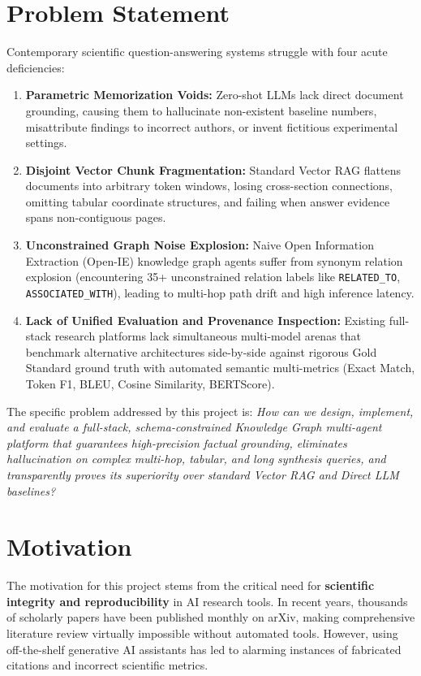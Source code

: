 \section{Problem Statement}
Contemporary scientific question-answering systems struggle with four acute deficiencies:
\begin{enumerate}
    \item \textbf{Parametric Memorization Voids:} Zero-shot LLMs lack direct document grounding, causing them to hallucinate non-existent baseline numbers, misattribute findings to incorrect authors, or invent fictitious experimental settings.
    \item \textbf{Disjoint Vector Chunk Fragmentation:} Standard Vector RAG flattens documents into arbitrary token windows, losing cross-section connections, omitting tabular coordinate structures, and failing when answer evidence spans non-contiguous pages.
    \item \textbf{Unconstrained Graph Noise Explosion:} Naive Open Information Extraction (Open-IE) knowledge graph agents suffer from synonym relation explosion (encountering 35+ unconstrained relation labels like \texttt{RELATED\_TO}, \texttt{ASSOCIATED\_WITH}), leading to multi-hop path drift and high inference latency.
    \item \textbf{Lack of Unified Evaluation and Provenance Inspection:} Existing full-stack research platforms lack simultaneous multi-model arenas that benchmark alternative architectures side-by-side against rigorous Gold Standard ground truth with automated semantic multi-metrics (Exact Match, Token F1, BLEU, Cosine Similarity, BERTScore).
\end{enumerate}

The specific problem addressed by this project is: \textit{How can we design, implement, and evaluate a full-stack, schema-constrained Knowledge Graph multi-agent platform that guarantees high-precision factual grounding, eliminates hallucination on complex multi-hop, tabular, and long synthesis queries, and transparently proves its superiority over standard Vector RAG and Direct LLM baselines?}

\section{Motivation}
The motivation for this project stems from the critical need for \textbf{scientific integrity and reproducibility} in AI research tools. In recent years, thousands of scholarly papers have been published monthly on arXiv, making comprehensive literature review virtually impossible without automated tools. However, using off-the-shelf generative AI assistants has led to alarming instances of fabricated citations and incorrect scientific metrics. 

